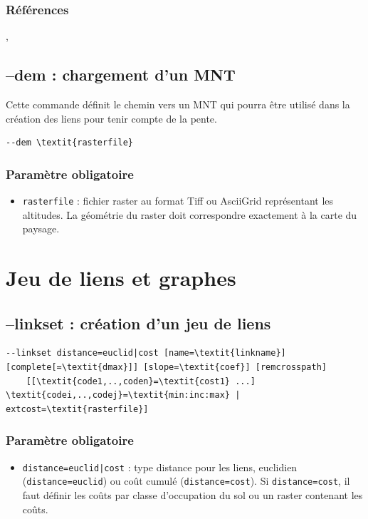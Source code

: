 \documentclass[a4paper,10pt]{report}
\begin{document}
\subsubsection{Références}
\cite{2015_monkey}, \cite{2016_campagnole}

\subsection{--dem : chargement d'un MNT}
Cette commande définit le chemin vers un MNT qui pourra être utilisé dans la création des liens pour tenir compte de la pente.
\begin{Verbatim}[commandchars=\\\{\}]
--dem \textit{rasterfile}
\end{Verbatim}

\subsubsection{Paramètre obligatoire}
\begin{itemize}
	\item \verb|rasterfile| : fichier raster au format Tiff ou AsciiGrid représentant les altitudes. La géométrie du raster doit correspondre exactement à la carte du paysage.
\end{itemize}

\section{Jeu de liens et graphes}

\subsection{--linkset : création d'un jeu de liens}
\begin{Verbatim}[commandchars=\\\{\}]
--linkset distance=euclid|cost [name=\textit{linkname}] [complete[=\textit{dmax}]] [slope=\textit{coef}] [remcrosspath] 
	[[\textit{code1,..,coden}=\textit{cost1} ...] \textit{codei,..,codej}=\textit{min:inc:max} | extcost=\textit{rasterfile}]
\end{Verbatim}

\subsubsection{Paramètre obligatoire}
\begin{itemize}
	\item \verb+distance=euclid|cost+ : type distance pour les liens, euclidien (\verb|distance=euclid|) ou coût cumulé (\verb|distance=cost|). Si \verb|distance=cost|, il faut définir les coûts par classe d'occupation du sol ou un raster contenant les coûts.
\end{itemize}
\end{document}
